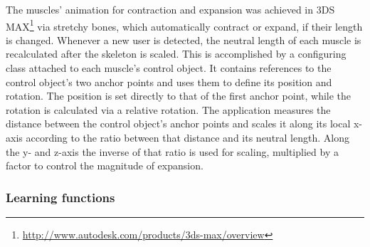 The muscles' animation for contraction and expansion was achieved in 3DS MAX\footnote{\url{http://www.autodesk.com/products/3ds-max/overview}} via stretchy bones, which automatically contract or expand, if their length is changed. 
Whenever a new user is detected, the neutral length of each muscle is recalculated after the skeleton is scaled.
This is accomplished by a configuring class attached to each muscle's control object. It contains references to the control object's two anchor points and uses them to define its position and rotation. The position is set directly to that of the first anchor point, while the rotation is calculated via a relative rotation.
The application measures the distance between the control object's anchor points and scales it along its local x-axis according to the ratio between that distance and its neutral length. Along the y- and z-axis the inverse of that ratio is used for scaling, multiplied by a factor to control the magnitude of expansion. 

\subsubsection{Learning functions}
